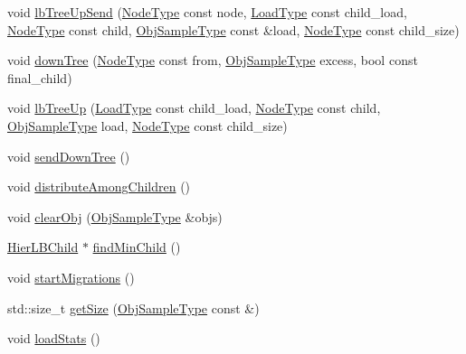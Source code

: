 \begin{DoxyCompactItemize}
\item 
void \hyperlink{structvt_1_1vrt_1_1collection_1_1lb_1_1_hierarchical_l_b_a8a9d35f8b4a8cd21461209136e64ad30}{lb\+Tree\+Up\+Send} (\hyperlink{namespacevt_a866da9d0efc19c0a1ce79e9e492f47e2}{Node\+Type} const node, \hyperlink{namespacevt_a8fb51741340b87d7aaee0bef60e9896b}{Load\+Type} const child\+\_\+load, \hyperlink{namespacevt_a866da9d0efc19c0a1ce79e9e492f47e2}{Node\+Type} const child, \hyperlink{structvt_1_1vrt_1_1collection_1_1lb_1_1_load_sampler_base_l_b_a8d939a849ec0d6371c1c4d441ffb9b94}{Obj\+Sample\+Type} const \&load, \hyperlink{namespacevt_a866da9d0efc19c0a1ce79e9e492f47e2}{Node\+Type} const child\+\_\+size)
\item 
void \hyperlink{structvt_1_1vrt_1_1collection_1_1lb_1_1_hierarchical_l_b_a1e7609043ea2b9830c8dd08ee0c38aa1}{down\+Tree} (\hyperlink{namespacevt_a866da9d0efc19c0a1ce79e9e492f47e2}{Node\+Type} const from, \hyperlink{structvt_1_1vrt_1_1collection_1_1lb_1_1_load_sampler_base_l_b_a8d939a849ec0d6371c1c4d441ffb9b94}{Obj\+Sample\+Type} excess, bool const final\+\_\+child)
\item 
void \hyperlink{structvt_1_1vrt_1_1collection_1_1lb_1_1_hierarchical_l_b_a6f030d878c37c7dbca04f71304319930}{lb\+Tree\+Up} (\hyperlink{namespacevt_a8fb51741340b87d7aaee0bef60e9896b}{Load\+Type} const child\+\_\+load, \hyperlink{namespacevt_a866da9d0efc19c0a1ce79e9e492f47e2}{Node\+Type} const child, \hyperlink{structvt_1_1vrt_1_1collection_1_1lb_1_1_load_sampler_base_l_b_a8d939a849ec0d6371c1c4d441ffb9b94}{Obj\+Sample\+Type} load, \hyperlink{namespacevt_a866da9d0efc19c0a1ce79e9e492f47e2}{Node\+Type} const child\+\_\+size)
\item 
void \hyperlink{structvt_1_1vrt_1_1collection_1_1lb_1_1_hierarchical_l_b_a1b7abcf40a8dfb63e9a2ee0842af413b}{send\+Down\+Tree} ()
\item 
void \hyperlink{structvt_1_1vrt_1_1collection_1_1lb_1_1_hierarchical_l_b_a15f26588a7e241d034ca627e463c1fdb}{distribute\+Among\+Children} ()
\item 
void \hyperlink{structvt_1_1vrt_1_1collection_1_1lb_1_1_hierarchical_l_b_a2190300d890419550a28b91e57ffacf6}{clear\+Obj} (\hyperlink{structvt_1_1vrt_1_1collection_1_1lb_1_1_load_sampler_base_l_b_a8d939a849ec0d6371c1c4d441ffb9b94}{Obj\+Sample\+Type} \&objs)
\item 
\hyperlink{structvt_1_1vrt_1_1collection_1_1lb_1_1_hier_l_b_child}{Hier\+L\+B\+Child} $\ast$ \hyperlink{structvt_1_1vrt_1_1collection_1_1lb_1_1_hierarchical_l_b_a4064a53d865ffe55ba520f0c75e9018d}{find\+Min\+Child} ()
\item 
void \hyperlink{structvt_1_1vrt_1_1collection_1_1lb_1_1_hierarchical_l_b_a0fa467216218289dba2de1c4f88b655e}{start\+Migrations} ()
\item 
std\+::size\+\_\+t \hyperlink{structvt_1_1vrt_1_1collection_1_1lb_1_1_hierarchical_l_b_ab895082b639e196f5a128785c7b9bdda}{get\+Size} (\hyperlink{structvt_1_1vrt_1_1collection_1_1lb_1_1_load_sampler_base_l_b_a8d939a849ec0d6371c1c4d441ffb9b94}{Obj\+Sample\+Type} const \&)
\item 
void \hyperlink{structvt_1_1vrt_1_1collection_1_1lb_1_1_hierarchical_l_b_a60a953c331b4a25cbe2b6f7b6d93bbb7}{load\+Stats} ()
\end{DoxyCompactItemize}

